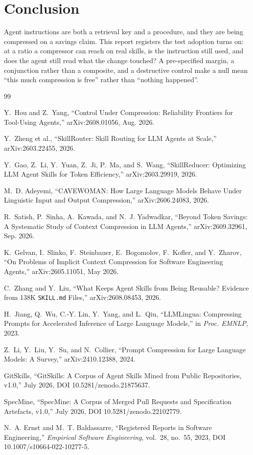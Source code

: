 \documentclass[10pt,conference]{IEEEtran}
\begin{document}
\section{Conclusion}
Agent instructions are both a retrieval key and a procedure, and they are being compressed on a savings claim. This report registers the test adoption turns on: at a ratio a compressor can reach on real skills, is the instruction still used, and does the agent still read what the change touched? A pre-specified margin, a conjunction rather than a composite, and a destructive control make a null mean ``this much compression is free'' rather than ``nothing happened''.

\begin{thebibliography}{99}
\scriptsize

Y.~Hou and Z.~Yang, ``Control Under Compression: Reliability Frontiers for Tool-Using Agents,'' arXiv:2608.01056, Aug. 2026.

Y.~Zheng et al., ``SkillRouter: Skill Routing for LLM Agents at Scale,'' arXiv:2603.22455, 2026.

Y.~Gao, Z.~Li, Y.~Yuan, Z.~Ji, P.~Ma, and S.~Wang, ``SkillReducer: Optimizing LLM Agent Skills for Token Efficiency,'' arXiv:2603.29919, 2026.

M.~D. Adeyemi, ``CAVEWOMAN: How Large Language Models Behave Under Linguistic Input and Output Compression,'' arXiv:2606.24083, 2026.

R.~Satish, P.~Sinha, A.~Kawada, and N.~J. Yadwadkar, ``Beyond Token Savings: A Systematic Study of Context Compression in LLM Agents,'' arXiv:2609.32961, Sep. 2026.

K.~Gelvan, I.~Slinko, F.~Steinbauer, E.~Bogomolov, F.~Kofler, and Y.~Zharov, ``On Problems of Implicit Context Compression for Software Engineering Agents,'' arXiv:2605.11051, May 2026.

C.~Zhang and Y.~Liu, ``What Keeps Agent Skills from Being Reusable? Evidence from 138K \texttt{SKILL.md} Files,'' arXiv:2608.08453, 2026.

H.~Jiang, Q.~Wu, C.-Y. Lin, Y.~Yang, and L.~Qiu, ``LLMLingua: Compressing Prompts for Accelerated Inference of Large Language Models,'' in \emph{Proc. EMNLP}, 2023.

Z.~Li, Y.~Liu, Y.~Su, and N.~Collier, ``Prompt Compression for Large Language Models: A Survey,'' arXiv:2410.12388, 2024.

GitSkills, ``GitSkills: A Corpus of Agent Skills Mined from Public Repositories, v1.0,'' July 2026, DOI 10.5281/zenodo.21875637.

SpecMine, ``SpecMine: A Corpus of Merged Pull Requests and Specification Artefacts, v1.0,'' July 2026, DOI 10.5281/zenodo.22102779.

N.~A. Ernst and M.~T. Baldassarre, ``Registered Reports in Software Engineering,'' \emph{Empirical Software Engineering}, vol.~28, no.~55, 2023, DOI 10.1007/s10664-022-10277-5.

\end{thebibliography}
\end{document}

